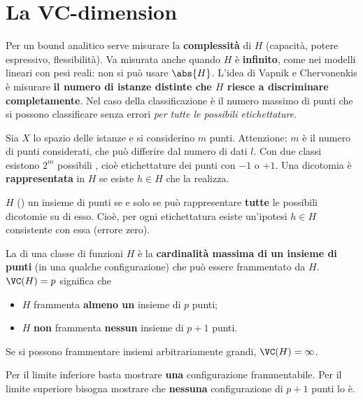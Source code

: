 \section{La VC-dimension}
\label{sec:vc}

Per un bound analitico serve misurare la \textbf{complessità} di $H$ (capacità, potere espressivo,
flessibilità). Va misurata anche quando $H$ è \textbf{infinito}, come nei modelli lineari con pesi reali: non si
può usare $\abs{H}$. L'idea di Vapnik e Chervonenkis è misurare \textbf{il numero di istanze distinte che $H$
riesce a discriminare completamente}. Nel caso della classificazione è il numero massimo di punti che si possono
classificare senza errori \emph{per tutte le possibili etichettature}.

Sia $X$ lo spazio delle istanze e si considerino $m$ punti. Attenzione: $m$ è il numero di punti considerati, che
può differire dal numero di dati $l$. Con due classi esistono $2^m$ possibili , cioè
etichettature dei punti con $-1$ o $+1$. Una dicotomia è \textbf{rappresentata} in $H$ se esiste $h\in H$ che la
realizza.

\begin{definizione}[Shattering]
$H$  () un insieme di punti se e solo se può rappresentare \textbf{tutte} le
possibili dicotomie su di esso. Cioè, per ogni etichettatura esiste un'ipotesi $h\in H$ consistente con essa
(errore zero).
\end{definizione}

\begin{definizione}[VC-dimension]
La  di una classe di funzioni $H$ è la \textbf{cardinalità massima di un insieme di punti}
(in una qualche configurazione) che può essere frammentato da $H$. $\VC(H) = p$ significa che
\begin{itemize}
  \item $H$ frammenta \textbf{almeno un} insieme di $p$ punti;
  \item $H$ \textbf{non} frammenta \textbf{nessun} insieme di $p+1$ punti.
\end{itemize}
Se si possono frammentare insiemi arbitrariamente grandi, $\VC(H) = \infty$.
\end{definizione}

\begin{attenzione}
Per il limite inferiore basta mostrare \textbf{una} configurazione frammentabile. Per il limite superiore bisogna
mostrare che \textbf{nessuna} configurazione di $p+1$ punti lo è.
\end{attenzione}

